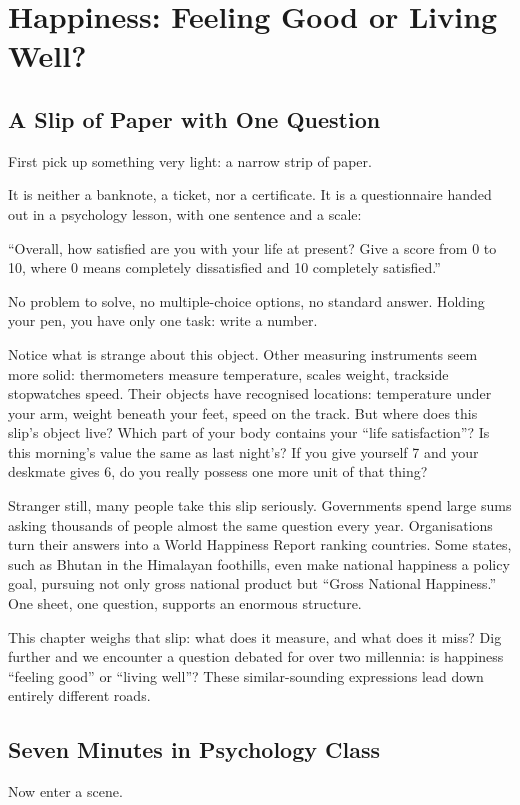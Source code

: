 \chapter[Feeling Good or Living Well?]{Happiness: Feeling Good or Living Well?}
\section{A Slip of Paper with One Question}
First pick up something very light: a narrow strip of paper.

It is neither a banknote, a ticket, nor a certificate. It is a questionnaire handed out in a psychology lesson, with one sentence and a scale:

``Overall, how satisfied are you with your life at present? Give a score from 0 to 10, where 0 means completely dissatisfied and 10 completely satisfied.''

No problem to solve, no multiple-choice options, no standard answer. Holding your pen, you have only one task: write a number.

Notice what is strange about this object. Other measuring instruments seem more solid: thermometers measure temperature, scales weight, trackside stopwatches speed. Their objects have recognised locations: temperature under your arm, weight beneath your feet, speed on the track. But where does this slip's object live? Which part of your body contains your ``life satisfaction''? Is this morning's value the same as last night's? If you give yourself 7 and your deskmate gives 6, do you really possess one more unit of that thing?

Stranger still, many people take this slip seriously. Governments spend large sums asking thousands of people almost the same question every year. Organisations turn their answers into a World Happiness Report ranking countries. Some states, such as Bhutan in the Himalayan foothills, even make national happiness a policy goal, pursuing not only gross national product but ``Gross National Happiness.'' One sheet, one question, supports an enormous structure.

This chapter weighs that slip: what does it measure, and what does it miss? Dig further and we encounter a question debated for over two millennia: is happiness ``feeling good'' or ``living well''? These similar-sounding expressions lead down entirely different roads.

\section{Seven Minutes in Psychology Class}
Now enter a scene.


